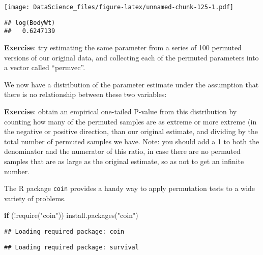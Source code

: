 \documentclass[
]{book}
\newenvironment{Shaded}{\begin{snugshade}}{\end{snugshade}}
\newcommand{\AttributeTok}[1]{\textcolor[rgb]{0.77,0.63,0.00}{#1}}
\newcommand{\ControlFlowTok}[1]{\textcolor[rgb]{0.13,0.29,0.53}{\textbf{#1}}}
\newcommand{\DecValTok}[1]{\textcolor[rgb]{0.00,0.00,0.81}{#1}}
\newcommand{\FunctionTok}[1]{\textcolor[rgb]{0.00,0.00,0.00}{#1}}
\newcommand{\NormalTok}[1]{#1}
\newcommand{\OtherTok}[1]{\textcolor[rgb]{0.56,0.35,0.01}{#1}}
\newcommand{\SpecialCharTok}[1]{\textcolor[rgb]{0.00,0.00,0.00}{#1}}
\newcommand{\StringTok}[1]{\textcolor[rgb]{0.31,0.60,0.02}{#1}}
\begin{document}
\texttt{[image: DataScience\_files/figure-latex/unnamed-chunk-125-1.pdf]}

\begin{Shaded}
\end{Shaded}

\begin{verbatim}
## log(BodyWt) 
##   0.6247139
\end{verbatim}

\textbf{Exercise}: try estimating the same parameter from a series of 100 permuted versions of our original data, and collecting each of the permuted parameters into a vector called ``permvec''.

We now have a distribution of the parameter estimate under the assumption that there is no relationship between these two variables:

\textbf{Exercise}: obtain an empirical one-tailed P-value from this distribution by counting how many of the permuted samples are as extreme or more extreme (in the negative or positive direction, than our original estimate, and dividing by the total number of permuted samples we have. Note: you should add a 1 to both the denominator and the numerator of this ratio, in case there are no permuted samples that are as large as the original estimate, so as not to get an infinite number.

The R package \texttt{coin} provides a handy way to apply permutation tests to a wide variety of problems.

\begin{Shaded}
\begin{Highlighting}[]
\ControlFlowTok{if}\NormalTok{ (}\SpecialCharTok{!}\FunctionTok{require}\NormalTok{(}\StringTok{"coin"}\NormalTok{)) }\FunctionTok{install.packages}\NormalTok{(}\StringTok{"coin"}\NormalTok{)}
\end{Highlighting}
\end{Shaded}

\begin{verbatim}
## Loading required package: coin
\end{verbatim}

\begin{verbatim}
## Loading required package: survival
\end{verbatim}
\end{document}
